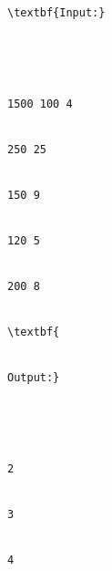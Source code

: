 \begin{verbatim}
\textbf{Input:}





1500 100 4


250 25


150 9


120 5


200 8


\textbf{


Output:}





2


3


4


\end{verbatim}